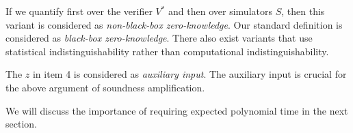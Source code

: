 If we quantify first over the verifier $V^*$ and then over simulators $S$, then this variant is considered as \emph{non-black-box zero-knowledge}. Our standard definition is considered as \emph{black-box zero-knowledge}. There  also exist variants that use statistical indistinguishability rather than computational indistinguishability.

The $z$ in item 4 is considered as \emph{auxiliary input}. The auxiliary input is crucial for the above argument of soundness amplification.

We will discuss the importance of requiring expected polynomial time in the next section. \bigskip
%		


